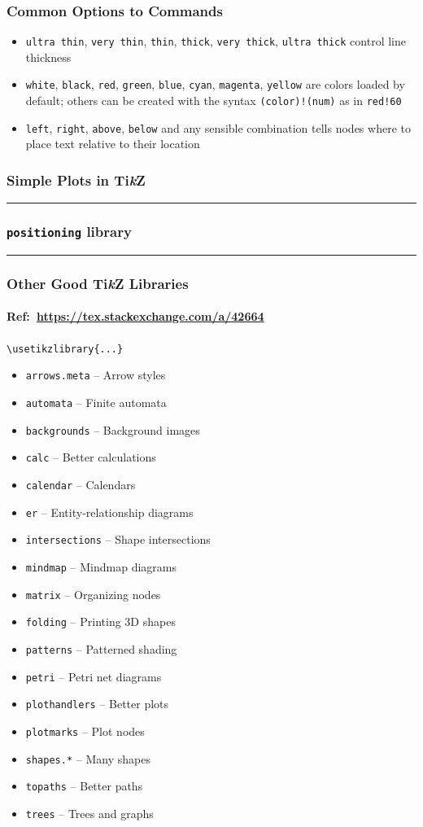 \documentclass{beamer}
\newcommand{\samplerow}[2]{
	\begin{frame}
	\frametitle{#2}
	
	\hrule
	\vspace*{4pt}
	\begin{minipage}{\linewidth}
		
	\end{minipage}
	\end{frame}
}
\newcommand{\TikZ}{Ti\textit{k}Z\xspace}
\begin{document}
	\begin{frame}[fragile]
		\frametitle{Common Options to Commands}
		\begin{itemize}
			\item \verb$ultra thin$, \verb$very thin$, \verb$thin$, \verb$thick$, \verb$very thick$, \verb$ultra thick$ control line thickness
			\item \verb$white$, \verb$black$, \verb$red$, \verb$green$, \verb$blue$, \verb$cyan$, \verb$magenta$, \verb$yellow$ are colors loaded by default; others can be created with the syntax \verb$(color)!(num)$ as in \verb$red!60$
			\item \verb$left$, \verb$right$, \verb$above$, \verb$below$ and any sensible combination tells nodes where to place text relative to their location
		\end{itemize}
	\end{frame}

	\samplerow{Tikz-Plot.tex}{Simple Plots in \TikZ}
	\samplerow{Positioning-Tikz.tex}{\texttt{positioning} library}

	\begin{frame}[fragile]
		\frametitle{Other Good \TikZ Libraries}
		\framesubtitle{Ref:\ \url{https://tex.stackexchange.com/a/42664}}
		\begin{center}
			\verb$\usetikzlibrary{...}$
		\end{center}
		\begin{multicols}{2}
		\begin{itemize}
			\scriptsize
			\item \texttt{arrows.meta} -- Arrow styles
			\item \texttt{automata} -- Finite automata
			\item \texttt{backgrounds} -- Background images
			\item \texttt{calc} -- Better calculations
			\item \texttt{calendar} -- Calendars
			\item \texttt{er} -- Entity-relationship diagrams
			\item \texttt{intersections} -- Shape intersections
			\item \texttt{mindmap} -- Mindmap diagrams
			\item \texttt{matrix} -- Organizing nodes
			\item \texttt{folding} -- Printing 3D shapes
			\item \texttt{patterns} -- Patterned shading
			\item \texttt{petri} -- Petri net diagrams
			\item \texttt{plothandlers} -- Better plots
			\item \texttt{plotmarks} -- Plot nodes
			\item \texttt{shapes.*} -- Many shapes
			\item \texttt{topaths} -- Better paths
			\item \texttt{trees} -- Trees and graphs
		\end{itemize}
		\end{multicols}
	\end{frame}
\end{document}
